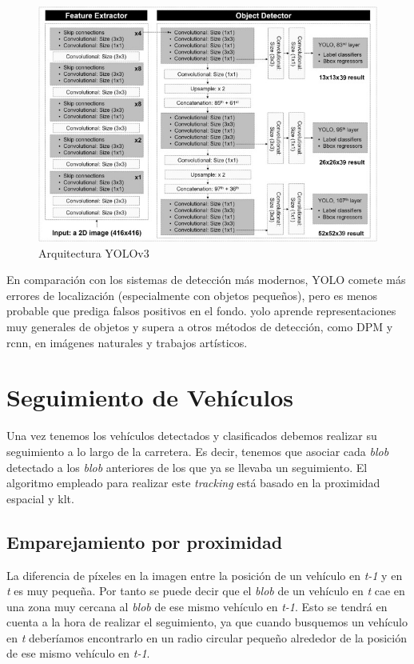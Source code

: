 \begin{figure}[H] 
\begin{center}
	\includegraphics[scale=0.7]{figures/Diseno_global/yolov3.png}
   \caption{Arquitectura YOLOv3}
	\label{fig.yolov3}
\end{center}
\end{figure}

En comparación con los sistemas de detección más modernos, YOLO comete más errores de localización (especialmente con objetos pequeños), pero es menos probable que prediga falsos positivos en el fondo. \acrshort{yolo} aprende representaciones muy generales de objetos y supera a otros métodos de detección, como DPM y \acrshort{rcnn}, en imágenes naturales y trabajos artísticos.


\section{Seguimiento de Vehículos}\label{sec.seguimiento}

Una vez tenemos los vehículos detectados y clasificados debemos realizar su seguimiento a lo largo de la carretera. Es decir, tenemos que asociar cada \textit{blob} detectado a los \textit{blob} anteriores de los que ya se llevaba un seguimiento. El algoritmo empleado para realizar este \textit{tracking} está basado en la proximidad espacial y \acrshort{klt}. 

\subsection{Emparejamiento por proximidad}

La diferencia de píxeles en la imagen entre la posición de un vehículo en \textit{t-1} y en \textit{t} es muy pequeña. Por tanto se puede decir que el \textit{blob} de un vehículo en \textit{t} cae en una zona muy cercana al \textit{blob} de ese mismo vehículo en \textit{t-1}. Esto se tendrá en cuenta a la hora de realizar el seguimiento, ya que cuando busquemos un vehículo en \textit{t} deberíamos encontrarlo en un radio circular pequeño alrededor de la posición de ese mismo vehículo en \textit{t-1}. 

